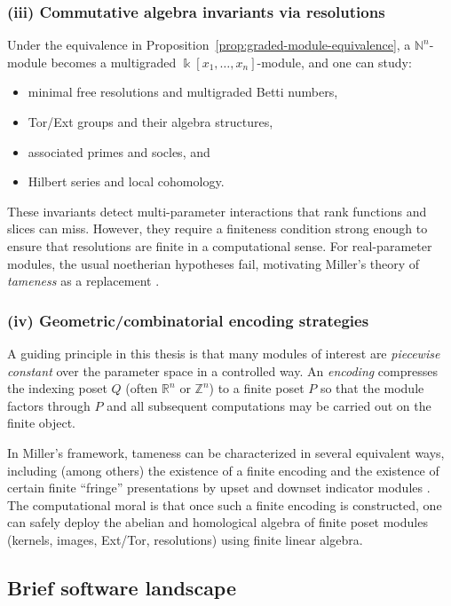 \documentclass{article}
\newcommand{\kk}{\Bbbk}
\newcommand{\<}{\langle}
\renewcommand{\>}{\rangle}
\newcommand{\bbb}[1]{\ensuremath{\mathbb{#1}}}
\theoremstyle{definition}
\theoremstyle{remark}
\begin{document}
	\subsubsection*{(iii) Commutative algebra invariants via resolutions}
	
	Under the equivalence in Proposition~\ref{prop:graded-module-equivalence}, a
	$\bbb{N}^n$-module becomes a multigraded $\kk[x_1,\dots,x_n]$-module, and one can
	study:
	\begin{itemize}
		\item minimal free resolutions and multigraded Betti numbers,
		\item Tor/Ext groups and their algebra structures,
		\item associated primes and socles, and
		\item Hilbert series and local cohomology.
	\end{itemize}
	These invariants detect multi-parameter interactions that rank functions and slices
	can miss.  However, they require a finiteness condition strong enough to ensure that
	resolutions are finite in a computational sense.  For real-parameter modules, the
	usual noetherian hypotheses fail, motivating Miller's theory of \emph{tameness} as a
	replacement \cite{Mil20}.
	
	\subsubsection*{(iv) Geometric/combinatorial encoding strategies}
	
	A guiding principle in this thesis is that many modules of interest are
	\emph{piecewise constant} over the parameter space in a controlled way.  An
	\emph{encoding} compresses the indexing poset $Q$ (often $\bbb{R}^n$ or $\bbb{Z}^n$)
	to a finite poset $P$ so that the module factors through $P$ and all subsequent
	computations may be carried out on the finite object.
	
	In Miller's framework, tameness can be characterized in several equivalent ways,
	including (among others) the existence of a finite encoding and the existence of
	certain finite ``fringe'' presentations by upset and downset indicator modules
	\cite{Mil20}.  The computational moral is that once such a finite encoding
	is constructed, one can safely deploy the abelian and homological algebra of finite
	poset modules (kernels, images, Ext/Tor, resolutions) using finite linear algebra.
	
	\subsection{Brief software landscape}
	\label{sec:background:software-landscape}
	
\end{document}
